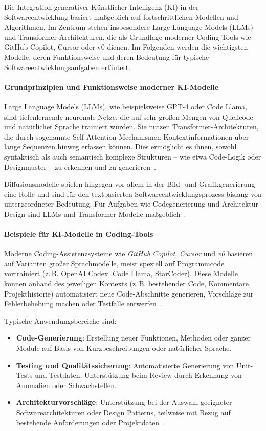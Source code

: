 Die Integration generativer Künstlicher Intelligenz (KI) in der
Softwareentwicklung basiert maßgeblich auf fortschrittlichen Modellen und
Algorithmen. Im Zentrum stehen insbesondere Large Language Models (LLMs) und
Transformer-Architekturen, die als Grundlage moderner Coding-Tools wie GitHub
Copilot, Cursor oder v0 dienen. Im Folgenden werden die wichtigsten Modelle,
deren Funktionsweise und deren Bedeutung für typische
Softwareentwicklungsaufgaben erläutert.

\paragraph{Grundprinzipien und Funktionsweise moderner KI-Modelle}

Large Language Models (LLMs), wie beispielsweise GPT-4 oder Code Llama, sind
tiefenlernende neuronale Netze, die auf sehr großen Mengen von Quellcode und
natürlicher Sprache trainiert wurden. Sie nutzen Transformer-Architekturen, die
durch sogenannte Self-Attention-Mechanismen Kontextinformationen über lange
Sequenzen hinweg erfassen können. Dies ermöglicht es ihnen, sowohl syntaktisch
als auch semantisch komplexe Strukturen – wie etwa Code-Logik oder Designmuster
– zu erkennen und zu generieren~\cite{nguyen-duc_generative_2023,
    esposito_generative_2025}.

Diffusionsmodelle spielen hingegen vor allem in der Bild- und Grafikgenerierung
eine Rolle und sind für den textbasierten Softwareentwicklungsprozess bislang
von untergeordneter Bedeutung. Für Aufgaben wie Codegenerierung und
Architektur-Design sind LLMs und Transformer-Modelle
maßgeblich~\cite{weisz_design_2024}.

\paragraph{Beispiele für KI-Modelle in Coding-Tools}

Moderne Coding-Assistenzsysteme wie \textit{GitHub Copilot}, \textit{Cursor}
und \textit{v0} basieren auf Varianten großer Sprachmodelle, meist speziell auf
Programmcode vortrainiert (z.\,B. OpenAI Codex, Code Llama, StarCoder). Diese
Modelle können anhand des jeweiligen Kontexts (z.\,B. bestehender Code,
Kommentare, Projekthistorie) automatisiert neue Code-Abschnitte generieren,
Vorschläge zur Fehlerbehebung machen oder Testfälle
entwerfen~\cite{coutinho_role_2024, esposito_generative_2025}.

Typische Anwendungsbereiche sind:
\begin{itemize}
    \item \textbf{Code-Generierung}: Erstellung neuer Funktionen, Methoden oder ganzer Module auf Basis von Kurzbeschreibungen oder natürlicher Sprache.
    \item \textbf{Testing und Qualitätssicherung}: Automatisierte Generierung von Unit-Tests und Testdaten, Unterstützung beim Review durch Erkennung von Anomalien oder Schwachstellen.
    \item \textbf{Architekturvorschläge}: Unterstützung bei der Auswahl geeigneter Softwarearchitekturen oder Design Patterns, teilweise mit Bezug auf bestehende Anforderungen oder Projektdaten~\cite{esposito_generative_2025}.
\end{itemize}

